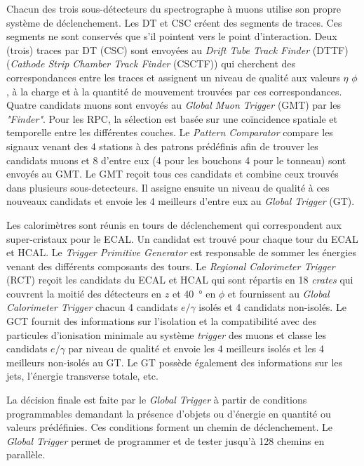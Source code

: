 Chacun des trois sous-détecteurs du spectrographe à muons utilise son propre système de déclenchement. Les DT et CSC créent des segments de traces. Ces segments ne sont conservés que s'il pointent vers le point d'interaction. Deux (trois) traces par DT (CSC) sont envoyées au \textit{Drift Tube Track Finder} (DTTF) (\textit{Cathode Strip Chamber Track Finder }(CSCTF)) qui cherchent des correspondances entre les traces et assignent un niveau de qualité aux valeurs $\eta$ $\phi$, à la charge et à la quantité de mouvement trouvées par ces correspondances. Quatre candidats muons sont envoyés au \textit{Global Muon Trigger} (GMT) par les \textit{"Finder"}. Pour les RPC, la sélection est basée sur une coïncidence spatiale et temporelle entre les différentes couches. Le \textit{Pattern Comparator} compare les signaux venant des \num{4} stations à des patrons prédéfinis afin de trouver les candidats muons et \num{8} d'entre eux (\num{4} pour les bouchons \num{4} pour le tonneau) sont envoyés au GMT. Le GMT reçoit tous ces candidats et combine ceux trouvés dans plusieurs sous-detecteurs. Il assigne ensuite un niveau de qualité à ces nouveaux candidats et envoie les \num{4} meilleurs d'entre eux au \textit{Global Trigger} (GT).

Les calorimètres sont réunis en tours de déclenchement qui correspondent aux super-cristaux pour le ECAL. Un candidat est trouvé pour chaque tour du ECAL et HCAL. Le \textit{Trigger Primitive Generator} est responsable de sommer les énergies venant des différents composants des tours.  Le \textit{Regional Calorimeter Trigger} (RCT) reçoit les candidats du ECAL et HCAL qui sont répartis en \num{18} \textit{crates} qui couvrent la moitié des détecteurs en $z$ et \SI{40}{\degree} en $\phi$ et fournissent au \textit{Global Calorimeter Trigger} chacun \num{4} candidats $e/\gamma$ isolés et \num{4} candidats non-isolés. Le GCT fournit des informations sur l'isolation et la compatibilité avec des particules d'ionisation minimale au système \textit{trigger} des muons et classe les candidats $e/\gamma$ par niveau de qualité et envoie les \num{4} meilleurs isolés et les \num{4} meilleurs non-isolés au GT. Le GT possède également des informations sur les jets, l'énergie transverse totale, etc.

La décision finale est faite par le \textit{Global Trigger} à partir de conditions programmables demandant la présence d'objets ou d'énergie en quantité ou valeurs prédéfinies. Ces conditions forment un chemin de déclenchement. Le \textit{Global Trigger} permet de programmer et de tester jusqu'à \num{128} chemins en parallèle. 

